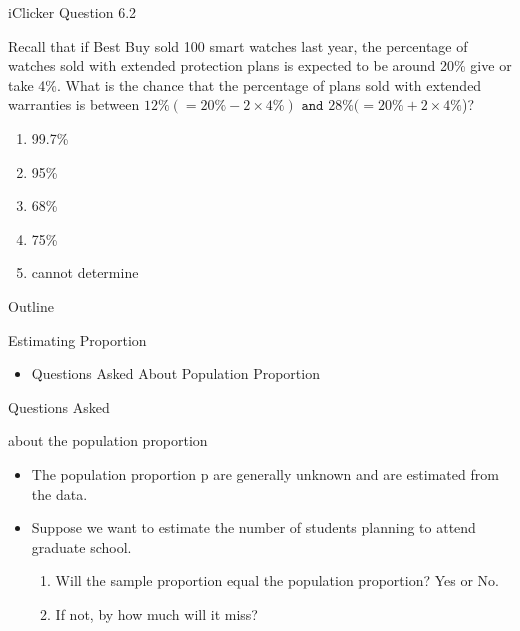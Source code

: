 \documentclass[14pt]{beamer}\usepackage[]{graphicx}\usepackage[]{color}
\begin{document}
\begin{frame}[fragile]{iClicker Question 6.2}

Recall that if Best Buy sold 100 smart watches last year, the percentage of  watches sold with extended protection plans is expected to be around 20\% give or take 4\%.  What is the chance that the percentage of plans sold with extended warranties is between  $12\% (= 20\% - 2 \times 4\%) \texttt{ and } 28\% (=  20\% + 2 \times 4\%$)?

\begin{enumerate}
\item 99.7\%
\item 95\%
\item 68\%
\item 75\%
\item cannot determine
\end{enumerate}
\end{frame}

\begin{frame}[fragile]{Outline}


Estimating Proportion

\begin{itemize}
 
\item<1-> Questions Asked About Population Proportion
\end{itemize}
\end{frame}

\begin{frame}[fragile]{Questions Asked}

about the population proportion

\begin{itemize}
\item<1-> The population proportion p are generally unknown and are  estimated from the data.
\item<2-> Suppose we want to estimate the number of students planning to  attend graduate school.
  \begin{enumerate}[1]
   \item<3-> Will the sample proportion equal the population proportion? Yes or  No.
    \item<4-> If not, by how much will it miss?
  \end{enumerate}
\end{itemize}
\end{frame}
\end{document}
